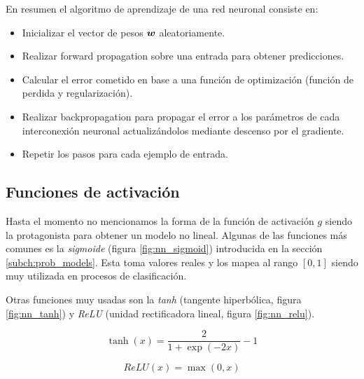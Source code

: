 En resumen el algoritmo de aprendizaje de una red neuronal consiste en:

\begin{itemize}
    \item Inicializar el vector de pesos $\boldsymbol{w}$ aleatoriamente.
    \item Realizar forward propagation sobre una entrada para obtener
    predicciones.
    \item Calcular el error cometido en base a una función de optimización
    (función de perdida y regularización).
    \item Realizar backpropagation para propagar el error a los parámetros de
    cada interconexión neuronal actualizándolos mediante descenso por el gradiente.
    \item Repetir los pasos para cada ejemplo de entrada.
\end{itemize}

\subsection{Funciones de activación}

Hasta el momento no mencionamos la forma de la función de activación $g$ siendo
la protagonista para obtener un modelo no lineal. Algunas de las funciones más
comunes es la \emph{sigmoide} (figura \ref{fig:nn_sigmoid}) introducida en la sección \ref{subch:prob_models}. Esta toma valores
reales y los mapea al rango $[0, 1]$ siendo muy utilizada en procesos de
clasificación.

Otras funciones muy usadas son la \emph{tanh} (tangente hiperbólica, figura \ref{fig:nn_tanh}) y
\emph{ReLU} (unidad rectificadora lineal, figura \ref{fig:nn_relu}).

\begin{equation}
    \tanh\left( x \right) = \frac{2}{1 + \exp(-2x)} - 1
\end{equation}

\begin{equation}
    ReLU\left( x \right) = \max(0, x)
\end{equation}


